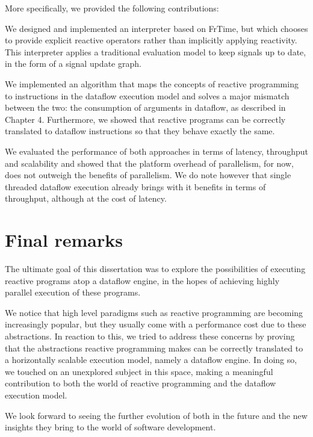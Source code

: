 More specifically, we provided the following contributions:

\begin{description}[style=nextline]
	\item[An interpreter for a reactive language] We designed and implemented an interpreter based on FrTime, but which chooses to provide explicit reactive operators rather than implicitly applying reactivity. This interpreter applies a traditional evaluation model to keep signals up to date, in the form of a signal update graph. 
	\item[A mapping algorithm from signals to dataflow instructions] We implemented an algorithm that maps the concepts of reactive programming to instructions in the dataflow execution model and solves a major mismatch between the two: the consumption of arguments in dataflow, as described in Chapter 4. Furthermore, we showed that reactive programs can be correctly translated to dataflow instructions so that they behave exactly the same. 
	\item[Comparison of a traditional reactive evaluation model and signals atop the dataflow execution model] We evaluated the performance of both approaches in terms of latency, throughput and scalability and showed that the platform overhead of parallelism, for now, does not outweigh the benefits of parallelism. We do note however that single threaded dataflow execution already brings with it benefits in terms of throughput, although at the cost of latency.
\end{description}

\newpage
\section{Final remarks}

The ultimate goal of this dissertation was to explore the possibilities of executing reactive programs atop a dataflow engine, in the hopes of achieving highly parallel execution of these programs. 

We notice that high level paradigms such as reactive programming are becoming increasingly popular, but they usually come with a performance cost due to these abstractions. In reaction to this, we tried to address these concerns by proving that the abstractions reactive programming makes can be correctly translated to a horizontally scalable execution model, namely a dataflow engine. In doing so, we touched on an unexplored subject in this space, making a meaningful contribution to both the world of reactive programming and the dataflow execution model. 

We look forward to seeing the further evolution of both in the future and the new insights they bring to the world of software development.  